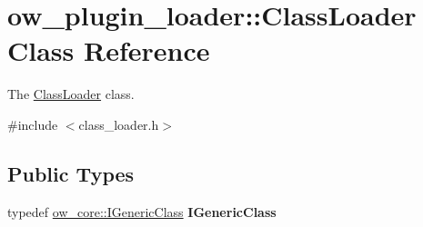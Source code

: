 \hypertarget{classow__plugin__loader_1_1ClassLoader}{}\section{ow\+\_\+plugin\+\_\+loader\+:\+:Class\+Loader Class Reference}
\label{classow__plugin__loader_1_1ClassLoader}


The \hyperlink{classow__plugin__loader_1_1ClassLoader}{Class\+Loader} class.  




{\ttfamily \#include $<$class\+\_\+loader.\+h$>$}

\subsection*{Public Types}
\begin{DoxyCompactItemize}
\item 
typedef \hyperlink{classow__core_1_1IGenericClass}{ow\+\_\+core\+::\+I\+Generic\+Class} {\bfseries I\+Generic\+Class}\hypertarget{classow__plugin__loader_1_1ClassLoader_aeb268b387f1810a002e0927e2f72a9d5}{}\label{classow__plugin__loader_1_1ClassLoader_aeb268b387f1810a002e0927e2f72a9d5}

\end{DoxyCompactItemize}
